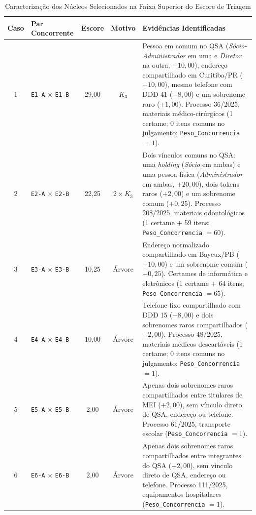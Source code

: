 \begin{table}[!t]
  \centering
  \caption{Caracterização dos Núcleos Selecionados na Faixa Superior do Escore de Triagem}
  \label{tab:analise_nucleos}
  \footnotesize
  \begin{tabular}{clccp{8.0cm}}
    \hline
    \textbf{Caso} & \textbf{Par Concorrente} & \textbf{Escore} & \textbf{Motivo} & \textbf{Evidências Identificadas} \\
    \hline
    1 & \texttt{E1-A} $\times$ \texttt{E1-B} & 29,00 & $K_3$ & Pessoa em comum no QSA (\textit{Sócio-Administrador} em uma e \textit{Diretor} na outra, $+10{,}00$), endereço compartilhado em Curitiba/PR ($+10{,}00$), mesmo telefone com DDD 41 ($+8{,}00$) e um sobrenome raro ($+1{,}00$). Processo 36/2025, materiais médico-cirúrgicos (1 certame; 0 itens comuns no julgamento; \texttt{Peso\_Concorrencia} $=1$). \\
    2 & \texttt{E2-A} $\times$ \texttt{E2-B} & 22,25 & $2 \times K_3$ & Dois vínculos comuns no QSA: uma \textit{holding} (\textit{Sócio} em ambas) e uma pessoa física (\textit{Administrador} em ambas, $+20{,}00$), dois tokens raros ($+2{,}00$) e um sobrenome comum ($+0{,}25$). Processo 208/2025, materiais odontológicos (1 certame + 59 itens; \texttt{Peso\_Concorrencia} $=60$). \\
    3 & \texttt{E3-A} $\times$ \texttt{E3-B} & 10,25 & Árvore & Endereço normalizado compartilhado em Bayeux/PB ($+10{,}00$) e um sobrenome comum ($+0{,}25$). Certames de informática e eletrônicos (1 certame + 64 itens; \texttt{Peso\_Concorrencia} $=65$). \\
    4 & \texttt{E4-A} $\times$ \texttt{E4-B} & 10,00 & Árvore & Telefone fixo compartilhado com DDD 15 ($+8{,}00$) e dois sobrenomes raros compartilhados ($+2{,}00$). Processo 48/2025, materiais médicos descartáveis (1 certame; 0 itens comuns no julgamento; \texttt{Peso\_Concorrencia} $=1$). \\
    5 & \texttt{E5-A} $\times$ \texttt{E5-B} & 2,00 & Árvore & Apenas dois sobrenomes raros compartilhados entre titulares de MEI ($+2{,}00$), sem vínculo direto de QSA, endereço ou telefone. Processo 61/2025, transporte escolar (\texttt{Peso\_Concorrencia} $=1$). \\
    6 & \texttt{E6-A} $\times$ \texttt{E6-B} & 2,00 & Árvore & Apenas dois sobrenomes raros compartilhados entre integrantes do QSA ($+2{,}00$), sem vínculo direto de QSA, endereço ou telefone. Processo 111/2025, equipamentos hospitalares (\texttt{Peso\_Concorrencia} $=1$). \\
    \hline
  \end{tabular}
\end{table}

